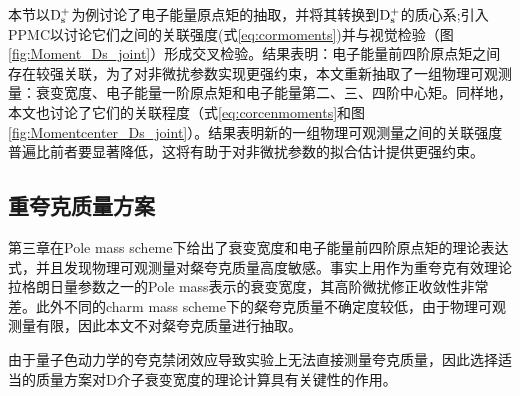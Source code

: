                 本节以$\mathrm{D_s^+}$为例讨论了电子能量原点矩的抽取，并将其转换到$\mathrm{D_s^+}$的质心系;引入PPMC以讨论它们之间的关联强度(式\eqref{eq:cormoments})并与视觉检验（图\ref{fig:Moment_Ds_joint}）形成交叉检验。结果表明：电子能量前四阶原点矩之间存在较强关联，为了对非微扰参数实现更强约束，本文重新抽取了一组物理可观测量：衰变宽度、电子能量一阶原点矩和电子能量第二、三、四阶中心矩。同样地，本文也讨论了它们的关联程度（式\eqref{eq:corcenmoments}和图\ref{fig:Momentcenter_Ds_joint}）。结果表明新的一组物理可观测量之间的关联强度普遍比前者要显著降低，这将有助于对非微扰参数的拟合估计提供更强约束。
\subsection{重夸克质量方案}

第三章在Pole mass scheme下给出了衰变宽度和电子能量前四阶原点矩的理论表达式，并且发现物理可观测量对粲夸克质量高度敏感。事实上用作为重夸克有效理论拉格朗日量参数之一的Pole mass表示的衰变宽度，其高阶微扰修正收敛性非常差。此外不同的charm mass scheme下的粲夸克质量不确定度较低，由于物理可观测量有限，因此本文不对粲夸克质量进行抽取。

由于量子色动力学的夸克禁闭效应导致实验上无法直接测量夸克质量，因此选择适当的质量方案对D介子衰变宽度的理论计算具有关键性的作用。

